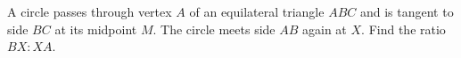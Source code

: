 A circle passes through vertex $A$ of an equilateral triangle $ABC$ and is tangent to side $BC$ at its midpoint $M$. The circle meets side $AB$ again at $X$. Find the ratio $BX:XA$.
